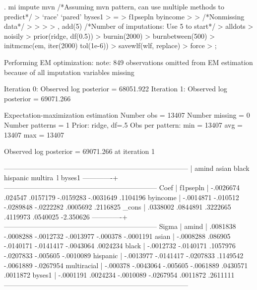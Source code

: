 \documentclass[12 pt]{article}
\begin{document}
\begin{stlog}
  . mi impute mvn /*Assuming mvn pattern, can use multiple methods to predict*/
> `race' `pared' byses1
> =
> f1psepln byincome 
> 
> /*Nonmissing data*/
> 
>   
> 
> ,  add(5)  /*Number of imputations: Use 5 to start*/
> alldots
> noisily
> prior(ridge, df(0.5))
> burnin(2000)
> burnbetween(500)
> initmcmc(em,  iter(2000) tol(1e-6))
> savewlf(wlf, replace)
> force
> ;

Performing EM optimization:
note: 849 observations omitted from EM estimation because of all imputation variables missing

Iteration 0:   Observed log posterior =  68051.922
Iteration 1:   Observed log posterior =  69071.266

Expectation-maximization estimation      Number obs           =     13407
                                         Number missing       =         0
                                         Number patterns      =         1
Prior: ridge, df=.5                      Obs per pattern: min =     13407
                                                          avg =     13407
                                                          max =     13407

Observed log posterior =  69071.266 at iteration 1

--------------------------------------------------------------------------------
             |     amind      asian      black   hispanic  multira~l     byses1 
-------------+------------------------------------------------------------------
Coef         |                                                                  
    f1psepln | -.0026674    .024547   .0157179  -.0159283  -.0031649   .1104196 
    byincome | -.0014871   -.010512  -.0289848  -.0222282   .0005692   .2116825 
       _cons |  .0338002   .0844891   .3222665   .4119973   .0540025  -2.350626 
-------------+------------------------------------------------------------------
Sigma        |                                                                  
       amind |  .0081838  -.0008288  -.0012732  -.0013977   -.000378  -.0001191 
       asian | -.0008288    .086905  -.0140171  -.0141417  -.0043064   .0024234 
       black | -.0012732  -.0140171   .1057976  -.0207833   -.005605  -.0010089 
    hispanic | -.0013977  -.0141417  -.0207833   .1149542  -.0061889  -.0267954 
 multiracial |  -.000378  -.0043064   -.005605  -.0061889   .0430571   .0011872 
      byses1 | -.0001191   .0024234  -.0010089  -.0267954   .0011872   .2611111 
--------------------------------------------------------------------------------

\end{stlog}
\end{document}
